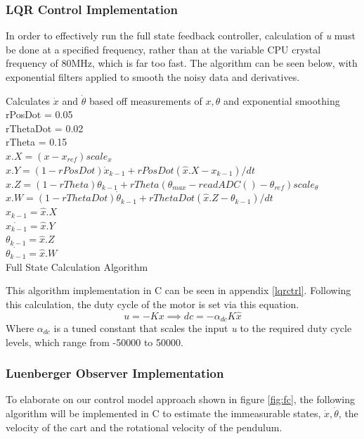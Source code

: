 \documentclass[12pt]{article}
\begin{document}
\subsubsection{LQR Control Implementation}
In order to effectively run the full state feedback controller, calculation of \textit{u} must be done at a specified frequency, rather than at the variable CPU crystal frequency of 80MHz, which is far too fast. The algorithm can be seen below, with exponential filters applied to smooth the noisy data and derivatives.\\
\footnotesize
\begin{algorithm}[H]
    \SetAlgoLined
    Calculates $\dot{x}$ and $\dot{\theta}$ based off measurements of $x,\theta$ and exponential smoothing\\
    rPosDot = 0.05\\
    rThetaDot = 0.02\\
    rTheta = 0.15\\
    \bigskip
    $\hat{x}.X = (x - x_{ref})scale_x$\\
    $\hat{x}.Y = (1-rPosDot)\dot{x}_{k-1} + rPosDot(\hat{x}.X - x_{k-1})/dt$\\
    $\hat{x}.Z = (1-rTheta)\theta_{k-1} + rTheta(\theta_{max}-readADC() - \theta_{ref})scale_\theta$\\
    $\hat{x}.W = (1-rThetaDot)\dot{\theta}_{k-1} + rThetaDot(\hat{x}.Z - \theta_{k-1})/dt$\\
    $x_{k-1} = \hat{x}.X$\\
    $\dot{x_{k-1}} = \hat{x}.Y$\\
    $\theta_{k-1} = \hat{x}.Z$\\
    $\dot{\theta_{k-1}} = \hat{x}.W$\\
    
    \caption{Full State Calculation Algorithm}
\end{algorithm}
\normalsize
This algorithm implementation in C can be seen in appendix \ref{lqrctrl}. Following this calculation, the duty cycle of the motor is set via this equation.
\begin{equation}
    u = -Kx \implies dc = -\alpha_{dc} K \hat{x}
\end{equation}
Where $\alpha_{dc}$ is a tuned constant that scales the input \textit{u} to the required duty cycle levels, which range from -50000 to 50000.
\subsubsection{Luenberger Observer Implementation}
To elaborate on our control model approach shown in figure \ref{fig:fc}, the following algorithm will be implemented in C to estimate the immeasurable states, $\dot{x}, \dot{\theta}$, the velocity of the cart and the rotational velocity of the pendulum.\\
\end{document}
